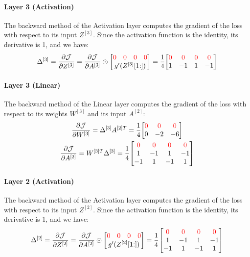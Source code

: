 \paragraph{Layer 3 (Activation)} The backward method of the Activation layer computes the gradient of the loss with respect to its input $Z^{[3]}$. Since the activation function is the identity, its derivative is 1, and we have:
\begin{equation*}
    \Delta^{[3]} = \pdv{\J}{Z^{[3]}} = \pdv{\J}{A^{[3]}} \odot \mqty[
        \mqty{\color{red} 0 & \color{red} 0 & \color{red} 0 & \color{red} 0} \\
        g'(Z^{[3]}[1\hspace{-0.6ex}:])
    ] = \frac{1}{4} \mqty[
        \color{red} 0 & \color{red} 0 & \color{red} 0 & \color{red} 0 \\
        1 & -1 & 1 & -1
    ]
\end{equation*}

\paragraph{Layer 3 (Linear)} The backward method of the Linear layer computes the gradient of the loss with respect to its weights $W^{[3]}$ and its input $A^{[2]}$:
\begin{gather*}
    \pdv{\J}{W^{[3]}} = \Delta^{[3]} A^{[2]T} = \frac{1}{4} \mqty[
        \color{red} 0 & \color{red} 0 & \color{red} 0 \\
        0 & -2 & -6
    ]\\
    \pdv{\J}{A^{[2]}} = W^{[3]T} \Delta^{[3]} = \frac{1}{4} \mqty[
        \color{red} 0 & \color{red} 0 & \color{red} 0 & \color{red} 0 \\
        1 & -1 & 1 & -1 \\
        -1 & 1 & -1 & 1
    ]
\end{gather*}

\paragraph{Layer 2 (Activation)} The backward method of the Activation layer computes the gradient of the loss with respect to its input $Z^{[2]}$. Since the activation function is the identity, its derivative is 1, and we have:
\begin{equation*}
    \Delta^{[2]} = \pdv{\J}{Z^{[2]}} = \pdv{\J}{A^{[2]}} \odot \mqty[
        \mqty{\color{red} 0 & \color{red} 0 & \color{red} 0 & \color{red} 0} \\
        g'(Z^{[2]}[1\hspace{-0.6ex}:])
    ] = \frac{1}{4} \mqty[
        \color{red} 0 & \color{red} 0 & \color{red} 0 & \color{red} 0 \\
        1 & -1 & 1 & -1 \\
        -1 & 1 & -1 & 1
    ]
\end{equation*}

